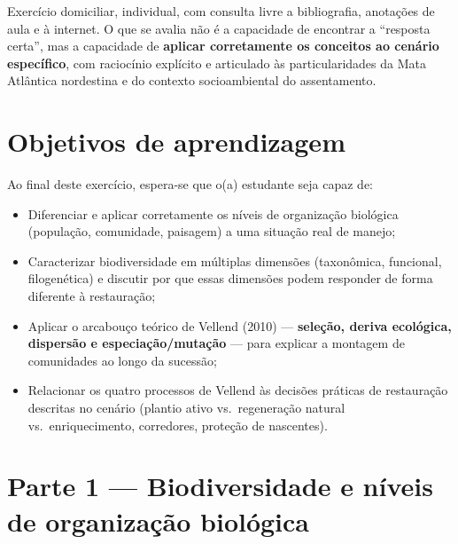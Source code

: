 \documentclass[
  brazilian,
  letterpaper,
  DIV=11,
  numbers=noendperiod]{scrartcl}
\providecommand{\tightlist}{%
  \setlength{\itemsep}{0pt}\setlength{\parskip}{0pt}}
\begin{document}
\begin{tcolorbox}[enhanced jigsaw, arc=.35mm, bottomrule=.15mm, bottomtitle=1mm, breakable, colback=white, colbacktitle=quarto-callout-note-color!10!white, colframe=quarto-callout-note-color-frame, coltitle=black, left=2mm, leftrule=.75mm, opacityback=0, opacitybacktitle=0.6, rightrule=.15mm, title=\textcolor{quarto-callout-note-color}{\faInfo}\hspace{0.5em}{Formato do exercício}, titlerule=0mm, toprule=.15mm, toptitle=1mm]

Exercício domiciliar, individual, com consulta livre a bibliografia,
anotações de aula e à internet. O que se avalia não é a capacidade de
encontrar a ``resposta certa'', mas a capacidade de \textbf{aplicar
corretamente os conceitos ao cenário específico}, com raciocínio
explícito e articulado às particularidades da Mata Atlântica nordestina
e do contexto socioambiental do assentamento.

\end{tcolorbox}

\section{Objetivos de aprendizagem}\label{objetivos-de-aprendizagem}

Ao final deste exercício, espera-se que o(a) estudante seja capaz de:

\begin{itemize}
\tightlist
\item
  Diferenciar e aplicar corretamente os níveis de organização biológica
  (população, comunidade, paisagem) a uma situação real de manejo;
\item
  Caracterizar biodiversidade em múltiplas dimensões (taxonômica,
  funcional, filogenética) e discutir por que essas dimensões podem
  responder de forma diferente à restauração;
\item
  Aplicar o arcabouço teórico de Vellend (2010) --- \textbf{seleção,
  deriva ecológica, dispersão e especiação/mutação} --- para explicar a
  montagem de comunidades ao longo da sucessão;
\item
  Relacionar os quatro processos de Vellend às decisões práticas de
  restauração descritas no cenário (plantio ativo vs.~regeneração
  natural vs.~enriquecimento, corredores, proteção de nascentes).
\end{itemize}

\section{Parte 1 --- Biodiversidade e níveis de organização
biológica}\label{parte-1-biodiversidade-e-nuxedveis-de-organizauxe7uxe3o-bioluxf3gica}
\end{document}
